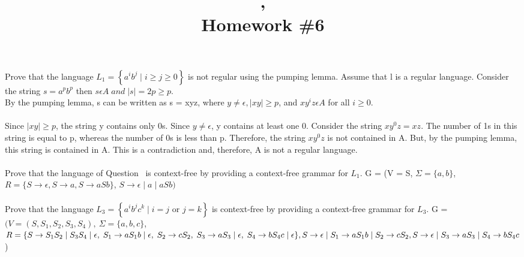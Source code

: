 \documentclass{article}
\title{\course, \term\\Homework \#6}
\begin{document}
\maketitle

\question%
Prove that the language $L_1= \left\{a^ib^j\mid i \geq j \geq 0\right\}$ is not
regular using the pumping lemma.
\answer
Assume that l is a regular language.  Consider the string $s=a^p b^p$ then $s \epsilon A\; 
and\; |s| = 2p \ge p$.\\
By the pumping lemma, s can be written as s = xyz, where $y \neq\epsilon, |xy| \ge p$, and $xy^iz 
\epsilon A$ for all $i \ge 0$.\\\\
Since $|xy| \ge p$, the string y contains only 0s. Since $y \neq \epsilon$, y contains at
least one 0. Consider the string $xy^0z = xz$. The number of 1s in this string
is equal to p, whereas the number of 0s is less than p. Therefore, the
string $xy^0z$ is not contained in A. But, by the pumping lemma, this string
is contained in A. This is a contradiction and, therefore, A is not a regular
language.\\\\
\question%
Prove that the language of Question~ is context-free by providing a context-free
grammar for $L_1$.
\answer
G = (V = {S}, $\Sigma = \{a,b\}$, $R=\{S\rightarrow \epsilon, S\rightarrow a, S\rightarrow aSb\}$,
$S\rightarrow\epsilon\mid a\mid aSb )$\\\\
\question%
Prove that the language
$L_3=\left\{a^ib^jc^k \mid i = j \mbox{ or } j = k\right\}$ is context-free by
providing a context-free grammar for $L_3$.
\answer
G = $(V = (S, S_{1},S_{2},S_{3},S_{4}),\:\Sigma = \{a,b,c\}$,\\ $R = \{S\rightarrow S_{1}S_{2}\mid
S_{3}S_{4}\mid \epsilon,\; S_{1}\rightarrow aS_{1}b\mid\epsilon,\; S_{2}\rightarrow cS_{2},\;
S_{3}\rightarrow aS_{3}\mid\epsilon,\; S_{4}\rightarrow bS_{4}c\mid\epsilon\},\\
S\rightarrow\epsilon\mid S_{1}\rightarrow aS_{1}b\mid S_{2}\rightarrow cS_{2},\\
S\rightarrow\epsilon\mid S_{3}\rightarrow aS_{3}\mid S_{4}\rightarrow bS_{4}c$)
\end{document}
